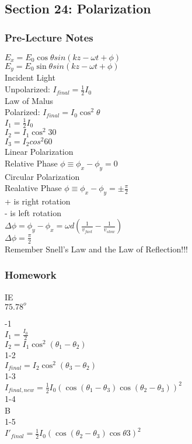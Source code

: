 \documentclass{article}
\begin{document}
\subsection{Section 24: Polarization}
\subsubsection{Pre-Lecture Notes}
$E_x = E_0 \cos \theta sin(kz - \omega t + \phi)$ \\
$E_y = E_0 \sin \theta sin(kz - \omega t + \phi)$ \\
Incident Light \\
Unpolarized:  $I_{final} = \frac{1}{2}I_0 $ \\
Law of Malus \\
Polarized: $I_{final} = I_0 \cos^2 \theta$ \\
$I_1 = \frac{1}{2}I_0$ \\
$I_2 = I_1 \cos^2 30$ \\
$I_3 = I_2 cos^2 60$ \\
Linear Polarization \\
Relative Phase $\phi \equiv \phi_x - \phi_y = 0$ \\
Circular Polarization \\
Realative Phase $\phi \equiv \phi_x - \phi_y = \pm \frac{\pi}{2}$ \\
+ is right rotation \\
- is left rotation \\
$\Delta \phi = \phi_y - \phi_x = \omega d (\frac{1}{v_{fast}} - \frac{1}{v_{slow}})$\\
$\Delta \phi = \frac{\pi}{2}$\\
Remember Snell's Law and the Law of Reflection!!! 

\subsubsection{Homework}
\noindent
IE \\
$75.78^o$

\vspace{2mm}

-1 \\
$I_1 = \frac{I_0}{2}$ \\
$I_2 = I_1 \cos^2(\theta_1 - \theta_2)$ \\
1-2 \\
$I_{final} = I_2 \cos^2(\theta_3 - \theta_2)$ \\
1-3 \\
$I_{final,new} = \frac{1}{2} I_0 (\cos(\theta_1 - \theta_3) \cos(\theta_2 - \theta_3))^2$ \\
1-4 \\
B \\
1-5 \\
$I'_{final} = \frac{1}{2} I_0 (\cos(\theta_2 - \theta_3) \cos \theta 3)^2$
\end{document}

